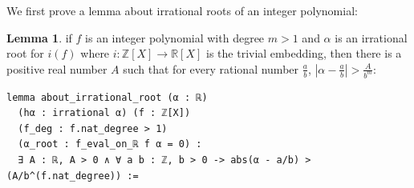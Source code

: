 \documentclass{report}
\theoremstyle{definition}
\newtheorem{lemma}{Lemma}[section]
\begin{document}
We first prove a lemma about irrational roots of an integer polynomial:
\begin{lemma}\label{lemma:irrationalRoot}
if $f$ is an integer polynomial with degree $m>1$ and $\alpha$ is an irrational root for $i(f)$ where $i:\mathbb Z[X]\to\mathbb R[X]$ is the trivial embedding, then there is a positive real number $A$ such that for every rational number $\frac ab$, $\left|\alpha-\frac ab\right| >\frac A {b^m}$:  

\begin{verbatim}
lemma about_irrational_root (α : ℝ)
  (hα : irrational α) (f : ℤ[X]) 
  (f_deg : f.nat_degree > 1)
  (α_root : f_eval_on_ℝ f α = 0) :
  ∃ A : ℝ, A > 0 ∧ ∀ a b : ℤ, b > 0 -> abs(α - a/b) > (A/b^(f.nat_degree)) :=
\end{verbatim}
\end{lemma}
\end{document}
